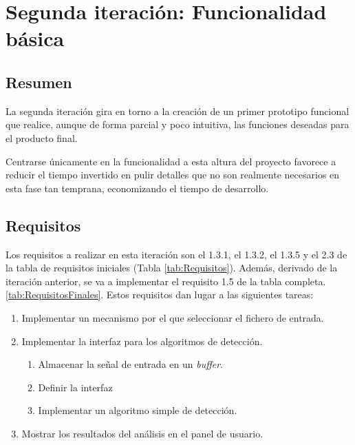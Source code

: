 
\section{Segunda iteración: Funcionalidad básica}
    \subsection{Resumen}
        La segunda iteración gira en torno a la creación de un primer prototipo funcional que realice, aunque de forma parcial y poco intuitiva, las funciones deseadas para el producto final.

        Centrarse únicamente en la funcionalidad a esta altura del proyecto favorece a reducir el tiempo invertido en pulir detalles que no son realmente necesarios en esta fase tan temprana, economizando el tiempo de desarrollo.

    \subsection{Requisitos}
        Los requisitos a realizar en esta iteración son el 1.3.1, el 1.3.2, el 1.3.5 y el 2.3 de la tabla de requisitos iniciales (Tabla \ref{tab:Requisitos}). Además, derivado de la iteración anterior, se va a implementar el requisito 1.5 de la tabla completa. \ref{tab:RequisitosFinales}. Estos requisitos dan lugar a las siguientes tareas:
    
        \begin{enumerate}
            \item Implementar un mecanismo por el que seleccionar el fichero de entrada.
            \item Implementar la interfaz para los algoritmos de detección.
            \begin{enumerate}
                \item Almacenar la señal de entrada en un \textit{buffer}.
                \item Definir la interfaz
                \item Implementar un algoritmo simple de detección.
            \end{enumerate}
            \item Mostrar los resultados del análisis en el panel de usuario.
        \end{enumerate}
        
